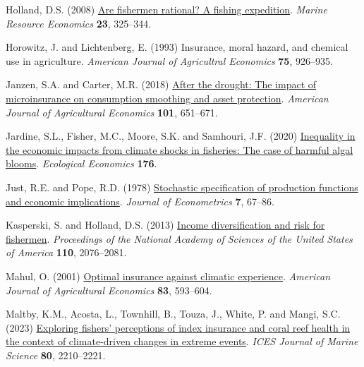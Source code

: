 \documentclass[
  letterpaper,
  DIV=11,
  numbers=noendperiod]{scrartcl}
\newlength{\cslhangindent}
\newlength{\cslentryspacingunit} %
\newenvironment{CSLReferences}[2] %
 {%
  \setlength{\parindent}{0pt}
  \ifodd #1
  \let\oldpar\par
  \def\par{\hangindent=\cslhangindent\oldpar}
  \fi
  \setlength{\parskip}{#2\cslentryspacingunit}
 }%
 {}
\theoremstyle{plain}
\theoremstyle{plain}
\theoremstyle{remark}
\begin{document}
\begin{CSLReferences}{1}{0}
\leavevmode{}%
Holland, D.S. (2008)
\href{https://doi.org/10.1086/mre.23.3.42629621}{Are fishermen rational?
A fishing expedition}. \emph{Marine Resource Economics} \textbf{23},
325--344.

\leavevmode{}%
Horowitz, J. and Lichtenberg, E. (1993) Insurance, moral hazard, and
chemical use in agriculture. \emph{American Journal of Agricultral
Economics} \textbf{75}, 926--935.

\leavevmode{}%
Janzen, S.A. and Carter, M.R. (2018)
\href{https://doi.org/10.1093/ajae/aay061}{After the drought: The impact
of microinsurance on consumption smoothing and asset protection}.
\emph{American Journal of Agricultural Economics} \textbf{101},
651--671.

\leavevmode{}%
Jardine, S.L., Fisher, M.C., Moore, S.K. and Samhouri, J.F. (2020)
\href{https://doi.org/10.1016/j.ecolecon.2020.106691}{Inequality in the
economic impacts from climate shocks in fisheries: The case of harmful
algal blooms}. \emph{Ecological Economics} \textbf{176}.

\leavevmode{}%
Just, R.E. and Pope, R.D. (1978)
\href{https://doi.org/10.1016/0304-4076(78)90006-4}{Stochastic
specification of production functions and economic implications}.
\emph{Journal of Econometrics} \textbf{7}, 67--86.

\leavevmode{}%
Kasperski, S. and Holland, D.S. (2013)
\href{https://doi.org/10.1073/pnas.1212278110}{Income diversification
and risk for fishermen}. \emph{Proceedings of the National Academy of
Sciences of the United States of America} \textbf{110}, 2076--2081.

\leavevmode{}%
Mahul, O. (2001) \href{https://doi.org/10.1111/0002-9092.00180}{Optimal
insurance against climatic experience}. \emph{American Journal of
Agricultural Economics} \textbf{83}, 593--604.

\leavevmode{}%
Maltby, K.M., Acosta, L., Townhill, B., Touza, J., White, P. and Mangi,
S.C. (2023) \href{https://doi.org/10.1093/icesjms/fsac003}{Exploring
fishers' perceptions of index insurance and coral reef health in the
context of climate-driven changes in extreme events}. \emph{ICES Journal
of Marine Science} \textbf{80}, 2210--2221.


\end{CSLReferences}
\end{document}
